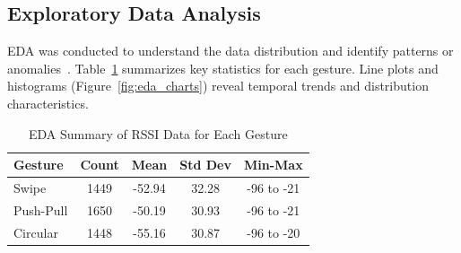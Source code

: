 \documentclass[10pt,twocolumn,letterpaper]{article}
\begin{document}
\subsection{Exploratory Data Analysis}

EDA was conducted to understand the data distribution and identify patterns or anomalies~\cite{abdelnasser2015wifi, wang2017wifi}. Table~\ref{table:eda_summary} summarizes key statistics for each gesture. Line plots and histograms (Figure~\ref{fig:eda_charts}) reveal temporal trends and distribution characteristics.

\begin{table}[h]
\centering
\caption{EDA Summary of RSSI Data for Each Gesture}
\label{table:eda_summary}
\begin{tabular}{|l|c|c|c|c|}
\hline
Gesture     & Count & Mean  & Std Dev & Min-Max \\ \hline
Swipe       & 1449  & -52.94 & 32.28   & -96 to -21 \\ \hline
Push-Pull   & 1650  & -50.19 & 30.93   & -96 to -21 \\ \hline
Circular    & 1448  & -55.16 & 30.87   & -96 to -20 \\ \hline
\end{tabular}
\end{table}
\end{document}
